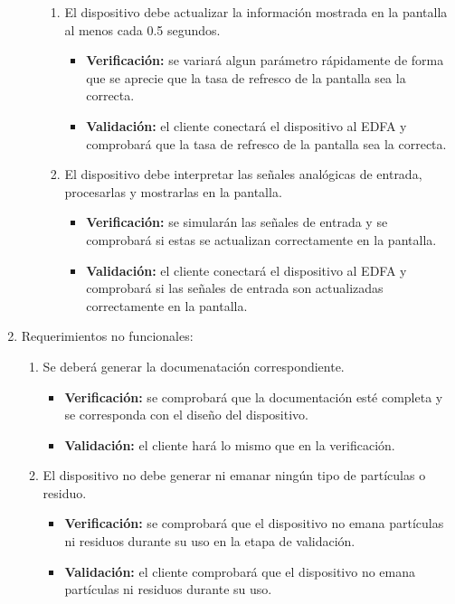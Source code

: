 \documentclass[
11pt, %
]{charter}
\begin{document}
\begin{enumerate}
\begin{enumerate}
\begin{enumerate}[label*=\arabic*.]
\item El dispositivo debe actualizar la información mostrada en la pantalla al menos cada 0.5 segundos.
\begin{itemize}
	\item \textbf{Verificación:} se variará algun parámetro rápidamente de forma que se aprecie que la tasa de refresco de la pantalla sea la correcta.
	\item \textbf{Validación:} el cliente conectará el dispositivo al EDFA y comprobará que la tasa de refresco de la pantalla sea la correcta.
\end{itemize}

\item El dispositivo debe interpretar las señales analógicas de entrada, procesarlas y mostrarlas en la pantalla.
\begin{itemize}
	\item \textbf{Verificación:} se simularán las señales de entrada y se comprobará si estas se actualizan correctamente en la pantalla.
	\item \textbf{Validación:} el cliente conectará el dispositivo al EDFA y comprobará si las señales de entrada son actualizadas correctamente en la pantalla.
\end{itemize}

\end{enumerate}

\end{enumerate}

\item Requerimientos no funcionales:
\begin{enumerate}
\item Se deberá generar la documenatación correspondiente.
\begin{itemize}
	\item \textbf{Verificación:} se comprobará que la documentación esté completa y se corresponda con el diseño del dispositivo.
	\item \textbf{Validación:} el cliente hará lo mismo que en la verificación.
\end{itemize}

\item El dispositivo no debe generar ni emanar ningún tipo de partículas o residuo.
\begin{itemize}
	\item \textbf{Verificación:} se comprobará que el dispositivo no emana partículas ni residuos durante su uso en la etapa de validación.
	\item \textbf{Validación:} el cliente comprobará que el dispositivo no emana partículas ni residuos durante su uso.
\end{itemize}


\end{enumerate}
\end{enumerate}
\end{document}
